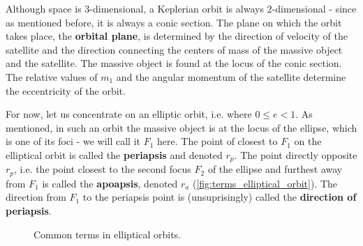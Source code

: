 Although space is 3-dimensional, a Keplerian orbit is always 2-dimensional - since as mentioned before, it is always a conic section. The plane on which the orbit takes place, the \textbf{orbital plane}, is determined by the direction of velocity of the satellite and the direction connecting the centers of mass of the massive object and the satellite. The massive object is found at the locus of the conic section. The relative values of $m_{1}$ and the angular momentum of the satellite determine the eccentricity of the orbit.

For now, let us concentrate on an elliptic orbit, i.e. where $0\leq e < 1$. As mentioned, in such an orbit the massive object is at the locus of the ellipse, which is one of its foci - we will call it $F_{1}$ here. The point of closest to $F_{1}$ on the elliptical orbit is called the \textbf{periapsis} and denoted $r_{p}$. The point directly opposite $r_{p}$, i.e. the point closest to the second focus $F_{2}$ of the ellipse and furthest away from $F_{1}$ is called the \textbf{apoapsis}, denoted $r_{a}$ (\autoref{fig:terms_elliptical_orbit}). The direction from $F_{1}$ to the periapsis point is (unsuprisingly) called the \textbf{direction of periapsis}.

\begin{figure}
  \begin{center}
  \end{center}
  \caption{Common terms in elliptical orbits.}
  \label{fig:terms_elliptical_orbit}
\end{figure}

